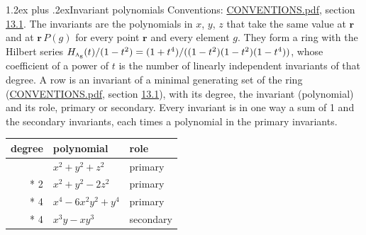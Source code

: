 \documentclass[10pt,a4paper]{article}
\makeatletter
\renewcommand\section{\@startsection{section}{1}{\z@}{-3ex plus -1ex minus -.2ex}%
  {1.2ex plus .2ex}{\normalfont\large\sffamily\bfseries\color{parttitle}}}
\numberwithin{equation}{section}
\newcommand{\irr}[1]{\text{\normalfont\scshape #1}}
\newcommand{\ptag}[1]{\mathrm{#1}}
\newcommand{\pointr}{\mathbf{r}}
\makeatother
\begin{document}
\section{Invariant polynomials}\label{s:invariant_polynomials}
Conventions: \href{../../CONVENTIONS.pdf}{CONVENTIONS.pdf}, section \href{../../CONVENTIONS.pdf\#conv.13.1}{13.1}.
The invariants are the polynomials in $x$, $y$, $z$ that take the same value at $\pointr$ and at $\pointr\,P(g)$ for every point $\pointr$ and every element $g$. They form a ring with the Hilbert series $H_{\irr{a}_{\ptag{g}}}(t)/(1-t^{2}) = (1 + t^{4})/((1-t^{2})(1-t^{2})(1-t^{4}))$, whose coefficient of a power of $t$ is the number of linearly independent invariants of that degree. \label{n:head.degree}\label{n:head.role}A row is an invariant of a minimal generating set of the ring (\href{../../CONVENTIONS.pdf}{CONVENTIONS.pdf}, section \href{../../CONVENTIONS.pdf\#conv.13.1}{13.1}), with its degree, the invariant (polynomial) and its role, primary or secondary. Every invariant is in one way a sum of 1 and the secondary invariants, each times a polynomial in the primary invariants.
{\small\begin{longtable}{@{}rll@{}}\toprule
degree & polynomial & role\\\midrule\endhead
\bottomrule\endfoot\endlastfoot
2 & $x^{2} + y^{2} + z^{2}$ & primary\\*
2 & $x^{2} + y^{2} - 2z^{2}$ & primary\\*
4 & $x^{4} - 6x^{2}y^{2} + y^{4}$ & primary\\*
4 & $x^{3}y - xy^{3}$ & secondary\\
\bottomrule\end{longtable}}
\end{document}
